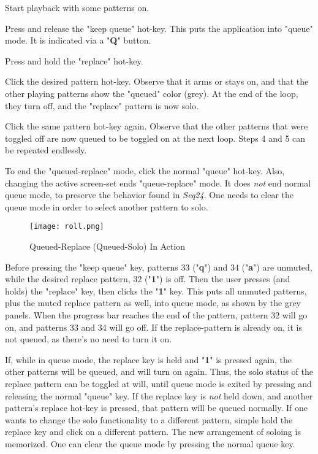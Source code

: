    \begin{enumber}
      \item Start playback with some patterns on. 
      \item Press and release
         the "keep queue" hot-key.  This puts the application into "queue" mode.
         It is indicated via a "\textbf{Q}" button.
      \item Press and hold the "replace" hot-key.
      \item Click the desired pattern hot-key.  Observe that it arms or
         stays on, and that the other playing patterns show the "queued" color
         (grey).  At the end of the loop, they turn off, and the "replace"
         pattern is now solo.
      \item Click the same pattern hot-key again.  Observe that the other
         patterns that were toggled off are now queued to be toggled on at the
         next loop.  Steps 4 and 5 can be repeated endlessly.
      \item To end
         the "queued-replace" mode, click the normal "queue"
         hot-key.  Also, changing the active screen-set ends "queue-replace"
         mode.  It does \textsl{not} end normal queue mode, to preserve the
         behavior found in \textsl{Seq24}.
         One needs to clear the queue mode in order to select another pattern
         to solo.
   \end{enumber}

\begin{figure}[H]
   \centering 
   \texttt{[image: roll.png]}
   \caption{Queued-Replace (Queued-Solo) In Action}
   \label{fig:queued_replace}
\end{figure}

   Before pressing the "keep queue" key, patterns 33 ("\textbf{q}")
   and 34 ("\textbf{a}") are
   unmuted, while the desired replace pattern, 32 ("\textbf{1}") is off.
   Then the user presses (and holds) the "replace" key, then clicks the
   "\textbf{1}" key.
   This puts all unmuted patterns, plus the muted
   replace pattern as well, into queue mode, as shown by the grey panels.
   When the progress bar reaches the end of the pattern, pattern 32 will go on,
   and patterns 33 and 34 will go off.
   If the replace-pattern is already on, it is not queued, as
   there's no need to turn it on.

   If, while in queue mode, the replace key is held and
   "\textbf{1}" is pressed again,
   the other patterns will be queued, and will turn on again.  Thus, the
   solo status of the replace pattern can be toggled at will, until queue mode
   is exited by pressing and releasing the normal "queue" key.
   If the replace key is \textsl{not} held down, and another pattern's replace
   hot-key is pressed, that pattern will be queued normally.
   If one wants to change the solo functionality to a different pattern,
   simple hold the replace key and click on a different pattern.  The new
   arrangement of soloing is memorized.
   One can clear the queue mode by pressing the normal queue key.

